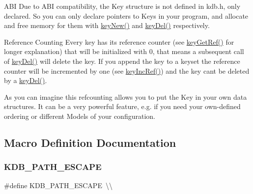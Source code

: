 \begin{DoxyParagraph}{A\+BI}
Due to A\+BI compatibility, the {\ttfamily Key} structure is not defined in kdb.\+h, only declared. So you can only declare {\ttfamily pointers} to {\ttfamily Keys} in your program, and allocate and free memory for them with \hyperlink{group__key_gad23c65b44bf48d773759e1f9a4d43b89}{key\+New()} and \hyperlink{group__key_ga3df95bbc2494e3e6703ece5639be5bb1}{key\+Del()} respectively.
\end{DoxyParagraph}
\begin{DoxyParagraph}{Reference Counting}
Every key has its reference counter (see \hyperlink{group__key_ga4aabc4272506dd63161db2bbb42de8ae}{key\+Get\+Ref()} for longer explanation) that will be initialized with 0, that means a subsequent call of \hyperlink{group__key_ga3df95bbc2494e3e6703ece5639be5bb1}{key\+Del()} will delete the key. If you append the key to a keyset the reference counter will be incremented by one (see \hyperlink{group__key_ga6970a6f254d67af7e39f8e469bb162f1}{key\+Inc\+Ref()}) and the key can\textquotesingle{}t be deleted by a \hyperlink{group__key_ga3df95bbc2494e3e6703ece5639be5bb1}{key\+Del()}.
\end{DoxyParagraph}
\begin{DoxyParagraph}{}
As you can imagine this refcounting allows you to put the Key in your own data structures. It can be a very powerful feature, e.\+g. if you need your own-\/defined ordering or different Models of your configuration. 
\end{DoxyParagraph}


\subsection{Macro Definition Documentation}
\mbox{\label{group__key_ga6d24980bc81c4276367f4e80725a8b61}} 
\subsubsection{\texorpdfstring{K\+D\+B\+\_\+\+P\+A\+T\+H\+\_\+\+E\+S\+C\+A\+PE}{KDB\_PATH\_ESCAPE}}
{\footnotesize\ttfamily \#define K\+D\+B\+\_\+\+P\+A\+T\+H\+\_\+\+E\+S\+C\+A\+PE~\textquotesingle{}\textbackslash{}\textbackslash{}\textquotesingle{}}



